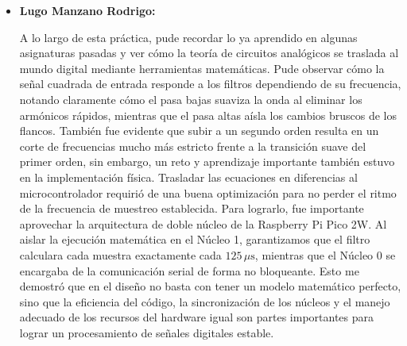 \documentclass[letterpaper,12pt]{article}
\begin{document}
\begin{itemize}
        Después de obtener las gráficas y hacer la comparación entre el primer y segundo orden pude visualizar la atenuacuión que ofrece cada tipo de filtro. Pude constatar que, aunque el filtro de segundo orden es más eficiente para aislar bandas de frecuencia específicas gracias a su corte más drástico, requiere una programación más cuidadosa de las ecuaciones en diferencias para asegurar la estabilidad del sistema. En esta práctica aprendí que un buen diseño matemático con una buena correcta implementación en hardware permite emular componentes analógicos con gran precisión, aprovechando la flexibilidad que ofrecen herramientas como Thony de MicroPython.
        
        \item \textbf{Lugo Manzano Rodrigo:}
        
        A lo largo de esta práctica, pude recordar lo ya aprendido en algunas asignaturas pasadas y ver cómo la teoría de circuitos analógicos se traslada al mundo digital mediante herramientas matemáticas. Pude observar cómo la señal cuadrada de entrada responde a los filtros dependiendo de su frecuencia, notando claramente cómo el pasa bajas suaviza la onda al eliminar los armónicos rápidos, mientras que el pasa altas aísla los cambios bruscos de los flancos. También fue evidente que subir a un segundo orden resulta en un corte de frecuencias mucho más estricto frente a la transición suave del primer orden, sin embargo, un reto  y aprendizaje importante también estuvo en la implementación física. Trasladar las ecuaciones en diferencias al microcontrolador requirió de una buena optimización para no perder el ritmo de la frecuencia de muestreo establecida. Para lograrlo, fue importante aprovechar la arquitectura de doble núcleo de la Raspberry Pi Pico 2W. Al aislar la ejecución matemática en el Núcleo 1, garantizamos que el filtro calculara cada muestra exactamente cada $125\,\mu\text{s}$, mientras que el Núcleo 0 se encargaba de la comunicación serial de forma no bloqueante. Esto me demostró que en el diseño no basta con tener un modelo matemático perfecto, sino que la eficiencia del código, la sincronización de los núcleos y el manejo adecuado de los recursos del hardware igual son partes importantes para lograr un procesamiento de señales digitales estable.
        
    \end{itemize}

    \newpage

    \nocite{*}
    \printbibliography[heading=bibintoc, title={Referencias}]
\end{document}
